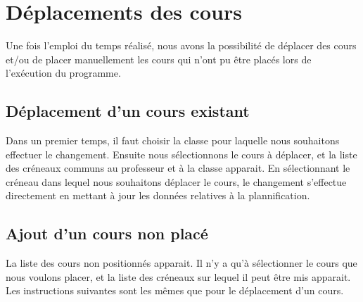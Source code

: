 \section{Déplacements des cours}

Une fois l'emploi du temps réalisé, nous avons la possibilité de déplacer des cours et/ou de placer manuellement les cours qui n'ont pu être placés lors de l'exécution du programme.

\subsection {Déplacement d'un cours existant}

Dans un premier temps, il faut choisir la classe pour laquelle nous souhaitons effectuer le changement. Ensuite nous sélectionnons le cours à déplacer, et la liste des créneaux communs au professeur et à la classe apparait. En sélectionnant le créneau dans lequel nous souhaitons déplacer le cours, le changement s'effectue directement en mettant à jour les données relatives à la plannification.

\subsection {Ajout d'un cours non placé}

La liste des cours non positionnés apparait. Il n'y a qu'à sélectionner le cours que nous voulons placer, et la liste des créneaux sur lequel il peut être mis apparait. Les instructions suivantes sont les mêmes que pour le déplacement d'un cours.